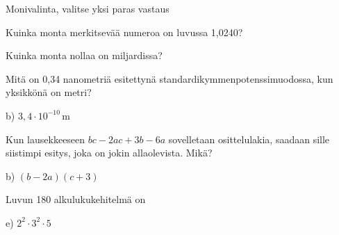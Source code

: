 Monivalinta, valitse yksi paras vastaus
\begin{tehtava}
Kuinka monta merkitsevää numeroa on luvussa 1,0240?
\begin{alakohdat}
\end{alakohdat}
\end{tehtava}

\begin{tehtava}
Kuinka monta nollaa on miljardissa?
\begin{alakohdat}
\end{alakohdat}
\end{tehtava}

\begin{tehtava}
Mitä on 0,34 nanometriä esitettynä standardikymmenpotenssimuodossa, kun yksikkönä on metri?
\begin{alakohdat}
\end{alakohdat}
\begin{vastaus}
b) $3,4 \cdot 10^{-10}$\,m
\end{vastaus}
\end{tehtava}

\begin{tehtava}
Kun lausekkeeseen $bc-2ac+3b-6a$ sovelletaan osittelulakia, saadaan sille siistimpi esitys, joka on jokin allaolevista. Mikä?
	\begin{alakohdat}
	\end{alakohdat}
    \begin{vastaus}
	b) $(b-2a)(c+3)$
    \end{vastaus}
\end{tehtava}

\begin{tehtava}
Luvun 180 alkulukukehitelmä on
\begin{alakohdat}
\end{alakohdat}
	\begin{vastaus}
	 e) $2^2\cdot3^2\cdot5$
	\end{vastaus}
\end{tehtava}

